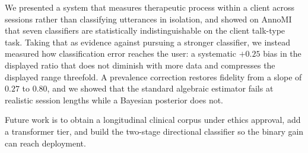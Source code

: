 \documentclass[conference]{IEEEtran}
\begin{document}
We presented a system that measures therapeutic process within a client across
sessions rather than classifying utterances in isolation, and showed on AnnoMI
that seven classifiers are statistically indistinguishable on the client
talk-type task. Taking that as evidence against pursuing a stronger
classifier, we instead measured how classification error reaches the user: a
systematic $+0.25$ bias in the displayed ratio that does not diminish with
more data and compresses the displayed range threefold. A prevalence
correction restores fidelity from a slope of $0.27$ to $0.80$, and we showed
that the standard algebraic estimator fails at realistic session lengths while
a Bayesian posterior does not.

Future work is to obtain a longitudinal clinical corpus under ethics approval,
add a transformer tier, and build the two-stage directional classifier so the
binary gain can reach deployment.



\end{document}
